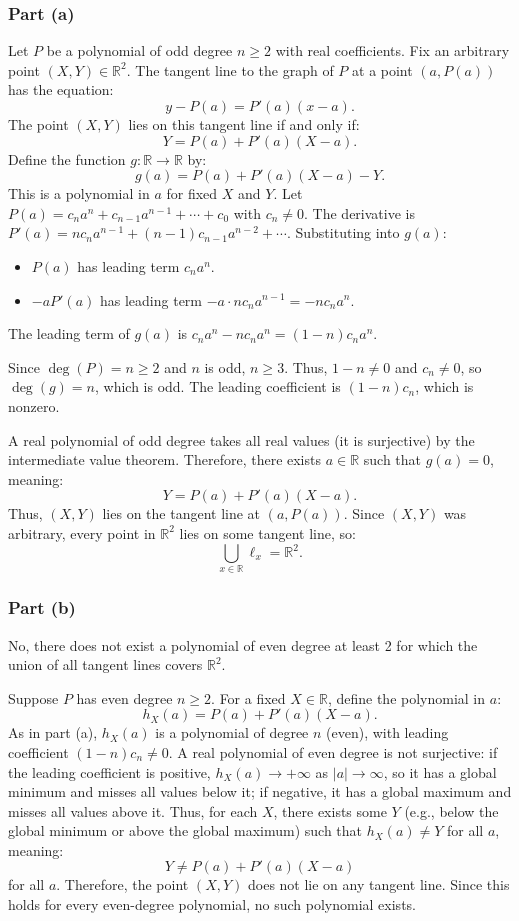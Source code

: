\documentclass[12pt,a4paper]{article}
\theoremstyle{definition}
\begin{document}
    \subsubsection*{Part (a)}
    Let $P$ be a polynomial of odd degree $n \geq 2$ with real coefficients. Fix an arbitrary point $(X, Y) \in \mathbb{R}^2$. The tangent line to the graph of $P$ at a point $(a, P(a))$ has the equation:
    \[
        y - P(a) = P'(a)(x - a).
    \]
    The point $(X, Y)$ lies on this tangent line if and only if:
    \[
        Y = P(a) + P'(a)(X - a).
    \]
    Define the function $g: \mathbb{R} \to \mathbb{R}$ by:
    \[
        g(a) = P(a) + P'(a)(X - a) - Y.
    \]
    This is a polynomial in $a$ for fixed $X$ and $Y$. Let $P(a) = c_n a^n + c_{n-1} a^{n-1} + \cdots + c_0$ with $c_n \neq 0$. The derivative is $P'(a) = n c_n a^{n-1} + (n-1) c_{n-1} a^{n-2} + \cdots$. Substituting into $g(a)$:
    \begin{itemize}
        \item $P(a)$ has leading term $c_n a^n$.
        \item $-a P'(a)$ has leading term $-a \cdot n c_n a^{n-1} = -n c_n a^n$.
    \end{itemize}
    The leading term of $g(a)$ is $c_n a^n - n c_n a^n = (1 - n) c_n a^n$.

    Since $\deg(P) = n \geq 2$ and $n$ is odd, $n \geq 3$. Thus, $1 - n \neq 0$ and $c_n \neq 0$, so $\deg(g) = n$, which is odd. The leading coefficient is $(1 - n) c_n$, which is nonzero.

    A real polynomial of odd degree takes all real values (it is surjective) by the intermediate value theorem. Therefore, there exists $a \in \mathbb{R}$ such that $g(a) = 0$, meaning:
    \[
        Y = P(a) + P'(a)(X - a).
    \]
    Thus, $(X, Y)$ lies on the tangent line at $(a, P(a))$. Since $(X, Y)$ was arbitrary, every point in $\mathbb{R}^2$ lies on some tangent line, so:
    \[
        \bigcup_{x \in \mathbb{R}} \ell_x = \mathbb{R}^2.
    \]

    \subsubsection*{Part (b)}
    No, there does not exist a polynomial of even degree at least 2 for which the union of all tangent lines covers $\mathbb{R}^2$.

    Suppose $P$ has even degree $n \geq 2$. For a fixed $X \in \mathbb{R}$, define the polynomial in $a$:
    \[
        h_X(a) = P(a) + P'(a)(X - a).
    \]
    As in part (a), $h_X(a)$ is a polynomial of degree $n$ (even), with leading coefficient $(1 - n) c_n \neq 0$. A real polynomial of even degree is not surjective: if the leading coefficient is positive, $h_X(a) \to +\infty$ as $|a| \to \infty$, so it has a global minimum and misses all values below it; if negative, it has a global maximum and misses all values above it. Thus, for each $X$, there exists some $Y$ (e.g., below the global minimum or above the global maximum) such that $h_X(a) \neq Y$ for all $a$, meaning:
    \[
        Y \neq P(a) + P'(a)(X - a)
    \]
    for all $a$. Therefore, the point $(X, Y)$ does not lie on any tangent line. Since this holds for every even-degree polynomial, no such polynomial exists.
\end{document}
